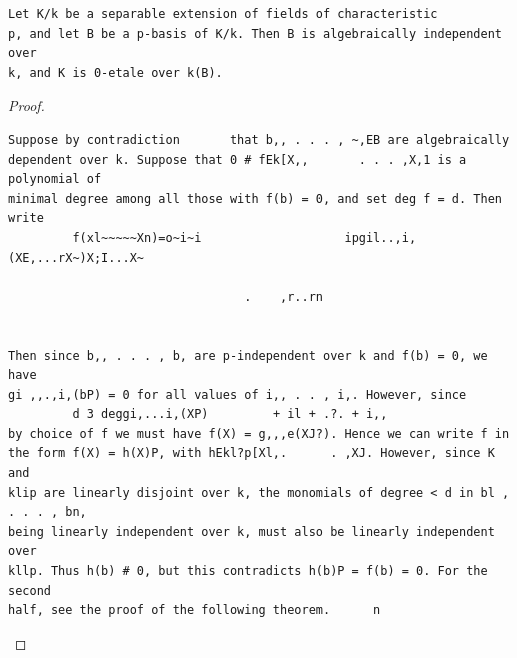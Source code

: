 \begin{theorem}\label{mcrt-auto-theorem-26-8}\uses{}
\begin{verbatim}
Let K/k be a separable extension of fields of characteristic
p, and let B be a p-basis of K/k. Then B is algebraically independent over
k, and K is 0-etale over k(B).
\end{verbatim}
\end{theorem}
\begin{proof}
\begin{verbatim}
Suppose by contradiction       that b,, . . . , ~,EB are algebraically
dependent over k. Suppose that 0 # fEk[X,,       . . . ,X,1 is a polynomial of
minimal degree among all those with f(b) = 0, and set deg f = d. Then write
         f(xl~~~~~Xn)=o~i~i                    ipgil..,i,(XE,...rX~)X;I...X~

                                 .    ,r..rn


Then since b,, . . . , b, are p-independent over k and f(b) = 0, we have
gi ,,.,i,(bP) = 0 for all values of i,, . . , i,. However, since
         d 3 deggi,...i,(XP)         + il + .?. + i,,
by choice of f we must have f(X) = g,,,e(XJ?). Hence we can write f in
the form f(X) = h(X)P, with hEkl?p[Xl,.      . ,XJ. However, since K and
klip are linearly disjoint over k, the monomials of degree < d in bl , . . . , bn,
being linearly independent over k, must also be linearly independent over
kllp. Thus h(b) # 0, but this contradicts h(b)P = f(b) = 0. For the second
half, see the proof of the following theorem.      n
\end{verbatim}
\end{proof}


